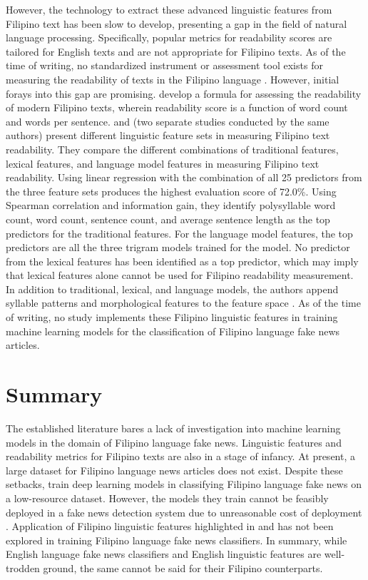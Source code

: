 However, the technology to extract these advanced linguistic features from Filipino text has been slow to develop, presenting a gap in the field of natural language processing. Specifically, popular metrics for readability scores are tailored for English texts and are not appropriate for Filipino texts. As of the time of writing, no standardized instrument or assessment tool exists for measuring the readability of texts in the Filipino language \cite{imperial-2020}. However, initial forays into this gap are promising.  develop a formula for assessing the readability of modern Filipino texts, wherein readability score is a function of word count and words per sentence.  and  (two separate studies conducted by the same authors) present different linguistic feature sets in measuring Filipino text readability. They compare the different combinations of traditional features, lexical features, and language model features in measuring Filipino text readability. Using linear regression with the combination of all 25 predictors from the three feature sets produces the highest evaluation score of 72.0\%. Using Spearman correlation and information gain, they identify polysyllable word count, word count, sentence count, and average sentence length as the top predictors for the traditional features. For the language model features, the top predictors are all the three trigram models trained for the model. No predictor from the lexical features has been identified as a top predictor, which may imply that lexical features alone cannot be used for Filipino readability measurement. In addition to traditional, lexical, and language models, the authors append syllable patterns and morphological features to the feature space \cite{imperial-2021, imperial-2020}. As of the time of writing, no study implements these Filipino linguistic features in training machine learning models for the classification of Filipino language fake news articles.

\section{Summary}

The established literature bares a lack of investigation into machine learning models in the domain of Filipino language fake news. Linguistic features and readability metrics for Filipino texts are also in a stage of infancy. At present, a large dataset for Filipino language news articles does not exist. Despite these setbacks,  train deep learning models in classifying Filipino language fake news on a low-resource dataset. However, the models they train cannot be feasibly deployed in a fake news detection system due to unreasonable cost of deployment \cite{cruz2020localization, paleyes-2022}. Application of Filipino linguistic features highlighted in  and  has not been explored in training Filipino language fake news classifiers. In summary, while English language fake news classifiers and English linguistic features are well-trodden ground, the same cannot be said for their Filipino counterparts.
